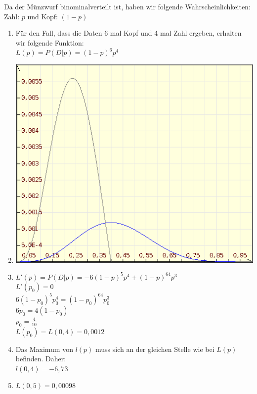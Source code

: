 \documentclass{homework}
\begin{document}
\begin{enumerate}
Da der Münzwurf binominalverteilt ist, haben wir folgende Wahrscheinlichkeiten:\\
Zahl: $p$ und Kopf: $(1-p)$ 
\begin{enumerate}
\item
	Für den Fall, dass die Daten 6 mal Kopf und 4 mal Zahl ergeben, erhalten wir folgende Funktion:\\
	$L(p) = P(D|p) = (1-p)^6p^4$
\item
	\includegraphics[scale=0.3]{u3_aufg4b.png} 
\item
	$L'(p) = P(D|p) = -6(1-p)^5p^4+(1-p)^64p^3$\\
	$L'(p_0) = 0$\\
	$6(1-p_0)^5p_0^4 = (1-p_0)^64p_0^3$\\
	$6p_0 = 4(1-p_0)$\\
	$p_0 = \frac{4}{10}$\\
	$L(p_0) = L(0,4) = 0,0012$\\
\item
	Das Maximum von $l(p)$ muss sich an der gleichen Stelle wie bei $L(p)$ befinden. Daher: \\
	$l(0,4) = -6,73$
\item
	$L(0,5) = 0,00098$
\end{enumerate}

\end{enumerate}
\end{document}
